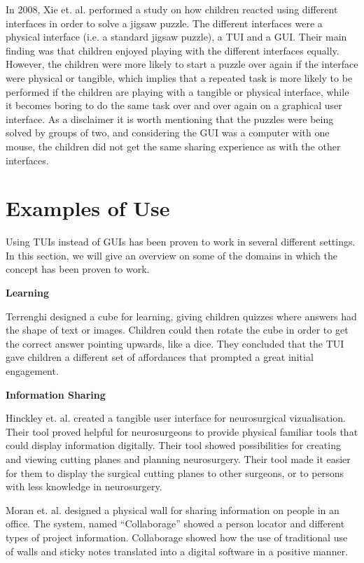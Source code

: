 In 2008, Xie et. al. performed a study on how children reacted using different interfaces in order to solve a jigsaw puzzle\cite{xie2008tangibles}. The different interfaces were a physical interface (i.e. a standard jigsaw puzzle), a TUI and a GUI. Their main finding was that children enjoyed playing with the different interfaces equally. However, the children were more likely to start a puzzle over again if the interface were physical or tangible, which implies that a repeated task is more likely to be performed if the children are playing with a tangible or physical interface, while it becomes boring to do the same task over and over again on a graphical user interface. As a disclaimer it is worth mentioning that the puzzles were being solved by groups of two, and considering the GUI was a computer with one mouse, the children did not get the same sharing experience as with the other interfaces. 


\section{Examples of Use}
\label{sec:tuiexamples}
Using TUIs instead of GUIs has been proven to work in several different settings. In this section, we will give an overview on some of the domains in which the concept has been proven to work. 

\textbf{Learning} 

Terrenghi \etal{} designed a cube for learning, giving children quizzes where answers had the shape of text or images\cite{terrenghi2006cube}. Children could then rotate the cube in order to get the correct answer pointing upwards, like a dice. They concluded that the TUI gave children a different set of affordances that prompted a great initial engagement\cite{terrenghi2006cube}. 

\textbf{Information Sharing} 

Hinckley et. al. created a tangible user interface for neurosurgical vizualisation\cite{hinckley1994passive}. Their tool proved helpful for neurosurgeons to provide physical familiar tools that could display information digitally. Their tool showed possibilities for creating and viewing cutting planes and planning neurosurgery. Their tool made it easier for them to display the surgical cutting planes to other surgeons, or to persons with less knowledge in neurosurgery. 

Moran et. al. designed a physical wall for sharing information on people in an office\cite{moran1999design}. The system, named ``Collaborage'' showed a person locator and different types of project information. Collaborage showed how the use of traditional use of walls and sticky notes translated into a digital software in a positive manner.


